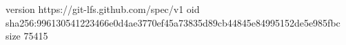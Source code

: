 version https://git-lfs.github.com/spec/v1
oid sha256:996130541223466e0d4ae3770ef45a73835d89cb44845e84995152de5e985fbc
size 75415
